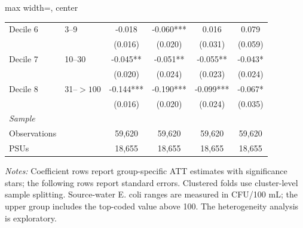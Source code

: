 \begin{landscape}
\begin{table}[p]
\begin{adjustbox}{max width=\linewidth, center}
\begin{tabular}{llcccc}
Decile 6 & 3--9 & -0.018 & -0.060*** & 0.016 & 0.079 \\
 &  & (0.016) & (0.020) & (0.031) & (0.059) \\
Decile 7 & 10--30 & -0.045** & -0.051** & -0.055** & -0.043* \\
 &  & (0.020) & (0.024) & (0.023) & (0.024) \\
Decile 8 & 31--$>100$ & -0.144*** & -0.190*** & -0.099*** & -0.067* \\
 &  & (0.016) & (0.020) & (0.024) & (0.035) \\
\multicolumn{6}{l}{\textit{Sample}} \\
\quad Observations &  & 59,620 & 59,620 & 59,620 & 59,620 \\
\quad PSUs &  & 18,655 & 18,655 & 18,655 & 18,655 \\
\bottomrule
\end{tabular}
\end{adjustbox}
\par\vspace{3pt}
\begin{minipage}{\linewidth}\footnotesize \textit{Notes:} Coefficient rows report group-specific ATT estimates with significance stars; the following rows report standard errors. Clustered folds use cluster-level sample splitting. Source-water E. coli ranges are measured in CFU/100 mL; the upper group includes the top-coded value above 100. The heterogeneity analysis is exploratory.\end{minipage}
\end{table}
\end{landscape}